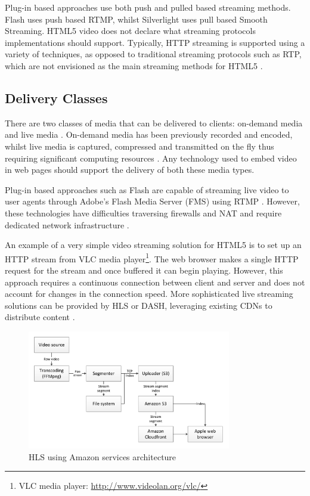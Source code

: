 \documentclass[journal]{IEEEtran}
\begin{document}
Plug-in based approaches use both push and pulled based streaming methods. Flash uses push based RTMP, whilst Silverlight uses pull based Smooth Streaming. HTML5 video does not declare what streaming protocols implementations should support. Typically, HTTP streaming is supported using a variety of techniques, as opposed to traditional streaming protocols such as RTP, which are not envisioned as the main streaming methods for HTML5 \cite{article:towardsVideoOnTheWebWithHTML5}.

\subsection{Delivery Classes}
There are two classes of media that can be delivered to clients: on-demand media and live media \cite{techreport:aReviewOfHTTPLiveStreaming}. On-demand media has been previously recorded and encoded, whilst live media is captured, compressed and transmitted on the fly thus requiring significant computing resources \cite{techreport:aReviewOfHTTPLiveStreaming}. Any technology used to embed video in web pages should support the delivery of both these media types.

Plug-in based approaches such as Flash are capable of streaming live video to user agents through Adobe's Flash Media Server (FMS) using RTMP \cite{techreport:aReviewOfHTTPLiveStreaming}. However, these technologies have difficulties traversing firewalls and NAT and require dedicated network infrastructure \cite{inproceedings:dynamicAdapativeHTTPStreamingLive}. %

An example of a very simple video streaming solution for HTML5 is to set up an HTTP stream from VLC media player\footnote{VLC media player: \url{http://www.videolan.org/vlc/}}. The web browser makes a single HTTP request for the stream and once buffered it can begin playing. However, this approach requires a continuous connection between client and server and does not account for changes in the connection speed. More sophisticated live streaming solutions can be provided by HLS or DASH, leveraging existing CDNs to distribute content \cite{techreport:aReviewOfHTTPLiveStreaming} \cite{inproceedings:dynamicAdapativeHTTPStreamingLive}. 

\begin{figure}[!t]
\centering
\includegraphics[width=3.5in]{streaming-diagram}
\caption{HLS using Amazon services architecture \cite{website:iPhoneHLSAmazon}}
\label{fig:hlsAmazonArch}
\end{figure} 
\end{document}
